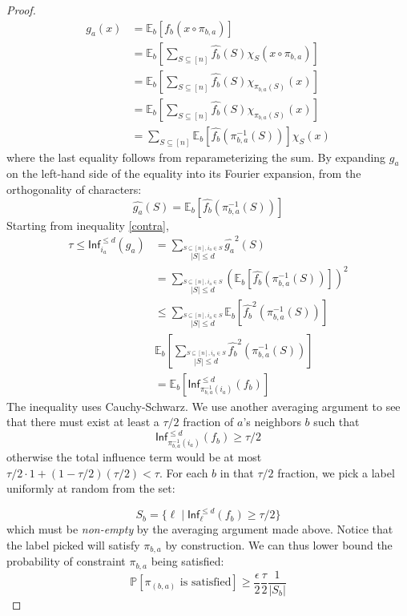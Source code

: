 \begin{proof}
\begin{align*}
  g_a(x) & = \mathbb{E}_{b}\left[ f_b(x \circ \pi_{b,a})\right] \\
         & = \mathbb{E}_{b}\left[ \sum_{S \subseteq [n]} \hat{f_b}(S)\chi_S(x \circ \pi_{b,a})\right] \\
         & = \mathbb{E}_{b}\left[\sum_{S \subseteq [n]} \hat{f_b}(S)\chi_{\pi_{b,a}(S)}(x) \right] \\
         & =  \mathbb{E}_{b}\left[\sum_{S \subseteq [n]} \hat{f_b}(S)\chi_{\pi_{b,a}(S)}(x) \right] \\
         & = \sum_{S \subseteq [n]}\mathbb{E}_{b}\left[ \hat{f_b}(\pi_{b,a}^{-1}(S))\right]\chi_{S}(x)
\end{align*}
where the last equality follows from reparameterizing the sum. By expanding $g_a$ on the left-hand side of the equality into its Fourier expansion, from the orthogonality of characters:
%
\begin{equation}
  \hat{g_a}(S) = \mathbb{E}_{b}\left[ \hat{f_b}(\pi_{b,a}^{-1}(S))\right]
\end{equation}
Starting from inequality \ref{contra},
%
\begin{align*}
  \tau \leq \mathsf{Inf}_{i_a}^{\leq d}(g_a)
  & = \sum_{\overset{S \subseteq [n], i_a \in S}{|S| \leq d}}  \hat{g_a}^2(S) \\
  & = \sum_{\overset{S \subseteq [n], i_a \in S}{|S| \leq d}}  \left(\mathbb{E}_{b}\left[ \hat{f_b}(\pi_{b,a}^{-1}(S))\right] \right)^2 \\
 & \leq \sum_{\overset{S \subseteq [n], i_a \in S}{|S| \leq d}}  \mathbb{E}_{b}\left[ \hat{f_b}^2(\pi_{b,a}^{-1}(S))\right] \\
 & \mathbb{E}_{b}\left[ \sum_{\overset{S \subseteq [n], i_a \in   S}{|S| \leq d}}  \hat{f_b}^2(\pi_{b,a}^{-1}(S))\right] \\
 & = \mathbb{E}_{b}\left[ \mathsf{Inf}^{\leq d}_{\pi_{b,a}^{-1}(i_a)}(f_b) \right]
\end{align*}
The inequality uses Cauchy-Schwarz.
We use another averaging argument to see that there must exist at least a $\tau/2$ fraction of $a$'s neighbors $b$ such that $$\mathsf{Inf}^{\leq d}_{\pi_{b,a}^{-1}(i_a)}(f_b) \geq \tau/2$$
otherwise the total influence term would be at most $\tau/2 \cdot 1 + (1 -\tau/2)(\tau/2) < \tau$.
For each $b$ in that $\tau/2$ fraction, we pick a label uniformly at random from the set:

\[ S_b = \{\ell \mid \mathsf{Inf}^{\leq d}_{\ell}(f_b) \geq \tau/2 \} \]
which must be \emph{non-empty} by the averaging argument made above. Notice that the label picked will satisfy $\pi_{b,a}$ by construction. We can thus lower bound the probability of constraint $\pi_{b,a}$ being satisfied:
%
\begin{equation} \label{probbound}
\mathbb{P}[\pi_{(b,a)} \text{ is satisfied}] \geq \frac{\epsilon}{2}\frac{\tau}{2}\frac{1}{|S_b|}
\end{equation}


\end{proof}
